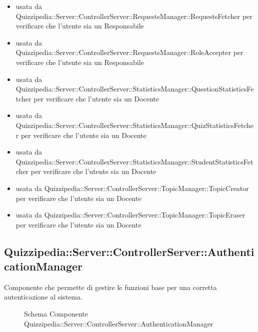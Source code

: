 \begin{itemize}
\item usata da Quizzipedia::Server::ControllerServer::RequestsManager::RequestsFetcher per verificare che l'utente sia un Responsabile
\item usata da Quizzipedia::Server::ControllerServer::RequestsManager::RoleAccepter per verificare che l'utente sia un Responsabile
\item usata da Quizzipedia::Server::ControllerServer::StatisticsManager::QuestionStatisticsFetcher per verificare che l'utente sia un Docente
\item usata da Quizzipedia::Server::ControllerServer::StatisticsManager::QuizStatisticsFetcher per verificare che l'utente sia un Docente
\item usata da Quizzipedia::Server::ControllerServer::StatisticsManager::StudentStatisticsFetcher per verificare che l'utente sia un Docente
\item usata da Quizzipedia::Server::ControllerServer::TopicManager::TopicCreator per verificare che l'utente sia un Docente
\item usata da Quizzipedia::Server::ControllerServer::TopicManager::TopicEraser per verificare che l'utente sia un Docente
\end{itemize}
\subsection{Quizzipedia::Server::ControllerServer::AuthenticationManager}
Componente che permette di gestire le funzioni base per una corretta autenticazione al sistema.
\begin{figure}[H]
\centering
\noindent{}
\caption[Schema Componente Quizzipedia::Server::ControllerServer::AuthenticationManager]{Schema Componente Quizzipedia::Server::ControllerServer::AuthenticationManager}
\end{figure}
